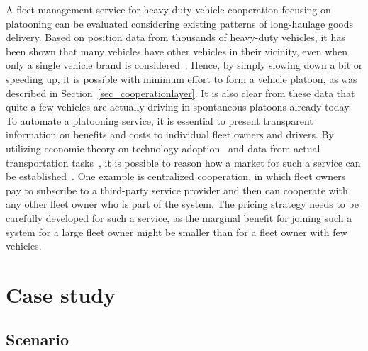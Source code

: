 \documentclass[journal]{IEEEtran}
\begin{document}
A fleet management service for heavy-duty vehicle cooperation focusing on platooning can be evaluated considering existing patterns of long-haulage goods delivery. Based on position data from thousands of heavy-duty vehicles, it has been shown that many vehicles have other vehicles in their vicinity, even when only a single vehicle brand is considered~\cite{liang_2014}. Hence, by simply slowing down a bit or speeding up, it is possible with minimum effort to form a vehicle platoon, as was described in Section~\ref{sec_cooperationlayer}. It is also clear from these data that quite a few vehicles are actually driving in spontaneous platoons already today. To automate a platooning service, it is essential to present transparent information on benefits and costs to individual fleet owners and drivers. By utilizing economic theory on technology adoption~\cite{rei83} and data from actual transportation tasks~\cite{liang_2014}, it is possible to reason how a market for such a service can be established~\cite{far+15msc}. One example is centralized cooperation, in which fleet owners pay to subscribe to a third-party service provider and then can cooperate with any other fleet owner who is part of the system. The pricing strategy needs to be carefully developed for such a service, as the marginal benefit for joining such a system for a large fleet owner might be smaller than for a fleet owner with few vehicles.




\section{Case study}\label{sec_evaluation}

\subsection{Scenario}
\end{document}
